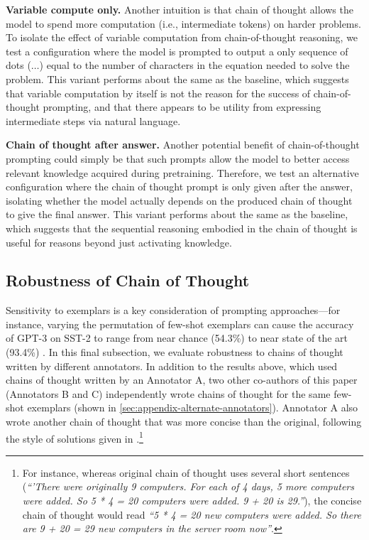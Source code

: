 \documentclass[]{article}
\theoremstyle{plain}
\theoremstyle{definition}
\theoremstyle{remark}
\begin{document}

\textbf{Variable compute only.}
Another intuition is that chain of thought allows the model to spend more computation (i.e., intermediate tokens) on harder problems. 
To isolate the effect of variable computation from chain-of-thought reasoning, we test a configuration where the model is prompted to output a only sequence of dots ($\ldots$) equal to the number of characters in the equation needed to solve the problem.
This variant performs about the same as the baseline, which suggests that variable computation by itself is not the reason for the success of chain-of-thought prompting, and that there appears to be utility from expressing intermediate steps via natural language.

\textbf{Chain of thought after answer.} 
Another potential benefit of chain-of-thought prompting could simply be that such prompts allow the model to better access relevant knowledge acquired during pretraining.
Therefore, we test an alternative configuration where the chain of thought prompt is only given after the answer, isolating whether the model actually depends on the produced chain of thought to give the final answer.
This variant performs about the same as the baseline, which suggests that the sequential reasoning embodied in the chain of thought is useful for reasons beyond just activating knowledge.


\subsection{Robustness of Chain of Thought}\label{subsec:robustness}

Sensitivity to exemplars is a key consideration of prompting approaches---for instance, varying the permutation of few-shot exemplars can cause the accuracy of GPT-3 on SST-2 to range from near chance (54.3\%) to near state of the art (93.4\%) \citep{zhao2021calibrate}.
In this final subsection, we evaluate robustness to chains of thought written by different annotators.
In addition to the results above, which used chains of thought written by an Annotator A, two other co-authors of this paper (Annotators B and C) independently wrote chains of thought for the same few-shot exemplars (shown in \cref{sec:appendix-alternate-annotators}).
Annotator A also wrote another chain of thought that was more concise than the original, following the style of solutions given in \citet{cobbe2021training}.\footnote{For instance, whereas original chain of thought uses several short sentences (\textit{``'There were originally 9 computers. For each of 4 days, 5 more computers were added. So 5 * 4 = 20 computers were added. 9 + 20 is 29.''}), the concise chain of thought would read \textit{``5 * 4 = 20 new computers were added. So there are 9 + 20 = 29 new computers in the server room now''}.}
\end{document}
